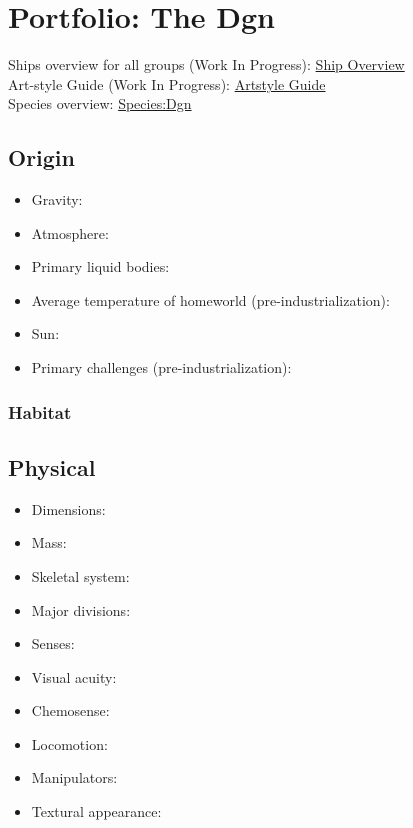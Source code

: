 \section{Portfolio: The Dgn}
Ships overview for all groups (Work In Progress): \href{http://vegastrike.sourceforge.net/wiki/Artstyle\_guide:Overview\_Guide}{Ship Overview} \\
Art-style Guide (Work In Progress): \href{http://vegastrike.sourceforge.net/wiki/Artstyle\_guide:Dgn}{Artstyle Guide} \\
Species overview: \href{http://vegastrike.sourceforge.net/wiki/Species:Dgn}{Species:Dgn} \\

\subsection{Origin}
\begin{itemize}
\item Gravity: 

\item Atmosphere: 

\item Primary liquid bodies: 

\item Average temperature of homeworld (pre-industrialization):

\item Sun: 

\item Primary challenges (pre-industrialization): 
\end{itemize}


\subsubsection{Habitat}

\subsection{Physical}
\begin{itemize}
\item Dimensions: 

\item Mass: 

\item Skeletal system: 

\item Major divisions: 

\item Senses: 

\item Visual acuity: 

\item Chemosense: 

\item Locomotion: 

\item Manipulators: 

\item Textural appearance: 
\end{itemize}

